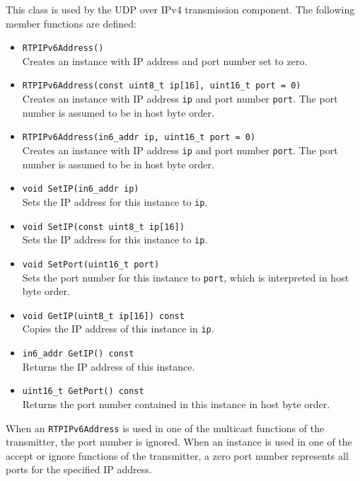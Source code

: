 \documentclass[12pt,a4paper]{article}
\begin{document}
					This class is used by the UDP over IPv4 transmission component.
					The following member functions are defined:
					\begin{itemize}
						\item {\tt RTPIPv6Address()}\\
							Creates an instance with IP address and port number set to
							zero.
						\item {\tt RTPIPv6Address(const uint8\_t ip[16], uint16\_t port = 0)}\\
							Creates an instance with IP address {\tt ip} and port
							number {\tt port}. The port number is assumed to be in
							host byte order.
						\item {\tt RTPIPv6Address(in6\_addr ip, uint16\_t port = 0)}\\
							Creates an instance with IP address {\tt ip} and port
							number {\tt port}. The port number is assumed to be in
							host byte order.
						\item {\tt void SetIP(in6\_addr ip)}\\
							Sets the IP address for this instance to {\tt ip}.
						\item {\tt void SetIP(const uint8\_t ip[16])}\\
							Sets the IP address for this instance to {\tt ip}.
						\item {\tt void SetPort(uint16\_t port)}\\
							Sets the port number for this instance to {\tt port}, which
							is interpreted in host byte order.
						\item {\tt void GetIP(uint8\_t ip[16]) const}\\
							Copies the IP address of this instance in {\tt ip}.
						\item {\tt in6\_addr GetIP() const}\\
							Returns the IP address of this instance.
						\item {\tt uint16\_t GetPort() const}\\
							Returns the port number contained in this instance in
							host byte order.
					\end{itemize}
					
					When an {\tt RTPIPv6Address} is used in one of the multicast
					functions of the transmitter, the port number is ignored. When
					an instance is used in one of the accept or ignore functions
					of the transmitter, a zero port number represents all ports
					for the specified IP address.
\end{document}
